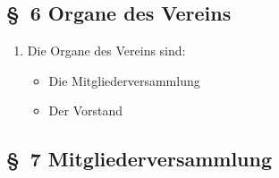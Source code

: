 \documentclass[10pt,a4paper]{scrartcl}
\begin{document}
\subsection*{\S \ 6 Organe des Vereins }
\begin{enumerate}
	\item Die Organe des Vereins sind:
		\begin{itemize}
			\item Die Mitgliederversammlung
			\item Der Vorstand
		\end{itemize}
\end{enumerate}
%
%
\subsection*{\S \ 7 Mitgliederversammlung}
\end{document}
